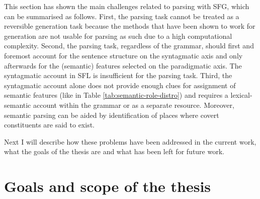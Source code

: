    This section has shown the main challenges related to parsing with SFG, which can be summarised as follows. 
    First, the parsing task cannot be treated as a reversible generation task because the methods that have been shown to work for generation are not usable for parsing as such due to a high computational complexity. Second, the parsing task, regardless of the grammar, should first and foremost account for the sentence structure on the syntagmatic axis and only afterwards for the (semantic) features selected on the paradigmatic axis. The syntagmatic account in SFL is insufficient for the parsing task. Third, the syntagmatic account alone does not provide enough clues for assignment of semantic features (like in Table \ref{tab:semantic-role-distro}) and requires a lexical-semantic account within the grammar or as a separate resource. Moreover, semantic parsing can be aided by identification of places where covert constituents are said to exist. %
    
    Next I will describe how these problems have been addressed in the current work, what the goals of the thesis are and what has been left for future work.

    

\section{Goals and scope of the thesis}
\label{sec:solution}

